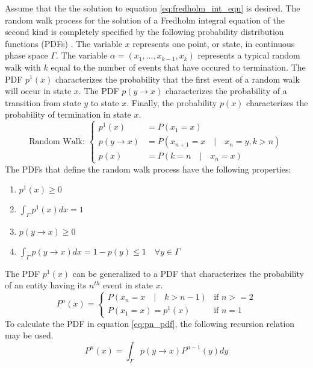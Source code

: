 Assume that the the solution to equation \ref{eq:fredholm_int_eqn} is desired.
The random walk process for the solution of a Fredholm integral equation of
the second kind is completely specified by the following probability
distribution functions (PDFs) \citep{spanier_monte_1969}. The variable $x$ 
represents one point, or state, in continuous phase space $\Gamma$. The 
variable $\alpha = (x_1,\ldots,x_{k-1},x_k)$ represents a typical random walk 
with $k$ equal to the number of events that have occured to termination. The 
PDF $p^1(x)$ characterizes the probability that the first event of a random 
walk will occur in state $x$. The PDF $p(y \to x)$ characterizes the probability
of a transition from state $y$ to state $x$. Finally, the probability $p(x)$
characterizes the probability of termination in state $x$. 
\begin{equation}
  \text{Random Walk: }
  \begin{cases}
    p^1(x) & = P(x_1 = x) \\
    p(y \to x) & = P(x_{n+1} = x \quad|\quad x_n = y, k > n)  \\
    p(x) & = P(k = n \quad|\quad x_n = x) 
  \end{cases}
  \label{eq:mc_random_walk_pdfs}
\end{equation}
The PDFs that define the random walk process have the following properties:
\begin{enumerate}
  \item $p^1(x) \geq 0$
  \item $\int_{\Gamma} p^1(x)dx = 1$
  \item $p(y \to x) \geq 0$
  \item $\int_{\Gamma} p(y \to x)dx = 1 - p(y) \leq 1 \quad \forall y \in\Gamma$
\end{enumerate}
The PDF $p^1(x)$ can be generalized to a PDF that characterizes the
probability of an entity having its $n^{th}$ event in state $x$. 
\begin{equation}
  P^n(x) = 
  \begin{cases} 
    P(x_n = x \quad|\quad k > n-1) & \text{if } n >= 2 \\
    P(x_1 = x) = p^1(x) & \text{if } n = 1 
  \end{cases}
  \label{eq:pn_pdf}
\end{equation}
To calculate the PDF in equation \ref{eq:pn_pdf}, the following recursion
relation may be used.
\begin{equation}
  P^n(x) = \int_{\Gamma} p(y \to x) P^{n-1}(y)dy
  \label{eq:pn_recursion_rel}
\end{equation}

